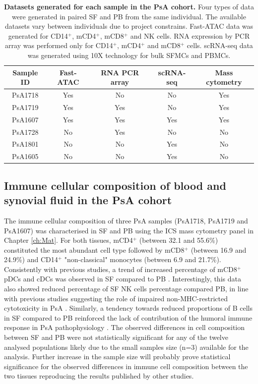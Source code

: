 \begin{table}[htbp]
\centering
\begin{tabular}{@{} c c c c c}
\toprule
\textbf{Sample ID} & \textbf{Fast-ATAC} & \textbf{RNA PCR array} & \textbf{scRNA-seq} & \textbf{Mass cytometry} \\
\midrule
\midrule
PsA1718 & Yes & No & No & Yes\\
PsA1719 & Yes & Yes & No & Yes\\
PsA1607 & Yes & Yes & Yes & Yes\\
PsA1728 & No & Yes & No & No\\
PsA1801 & No & No & Yes & No\\
PsA1605 & No & No & Yes & No\\
\bottomrule
\end{tabular}
\medskip %
\caption[Datasets generated for each sample in the PsA cohort.]{\textbf{Datasets generated for each sample in the PsA cohort.} Four types of data were generated in paired SF and PB from the same individual. The available datasets vary between individuals due to project constrains. Fast-ATAC data was generated for CD14$^+$, mCD4$^+$, mCD8$^+$ and NK cells. RNA expression by PCR array was performed only for CD14$^+$, mCD4$^+$ and mCD8$^+$ cells. scRNA-seq data was generated using 10X technology for bulk SFMCs and PBMCs.}
\label{tab:PSA_datasets_per_sample}
\end{table}
\bigskip %

\subsection{Immune cellular composition of blood and synovial fluid in the PsA cohort}
The immune cellular composition of three PsA samples (PsA1718, PsA1719 and PsA1607) was characterised in SF and PB using the ICS mass cytometry panel in Chapter \ref{ch:Mat}. For both tissues, mCD4$^+$ (between 32.1 and 55.6\%) constituted the most abundant cell type followed by mCD8$^+$ (between 16.9 and 24.9\%) and CD14$^+$ "non-classical" monocytes (between 6.9 and 21.7\%). Consistently with previous studies, a trend of increased percentage of mCD8$^+$ pDCs and cDCs was observed in SF compared to PB \parencite{Ross2000,Jongbloed2006}. Interestingly, this data also showed reduced percentage of SF NK cells percentage compared PB, in line with previous studies suggesting the role of impaired non-MHC-restricted cytotoxicity in PsA \parencite{Spadaro2004}. Similarly, a tendency towards reduced proportions of B cells  in SF compared to PB reinforced the lack of contribution of the humoral immune response in PsA pathophysiology \parencite{}. The observed differences in cell composition between SF and PB were not statistically significant for any of the twelve analysed populations likely due to the small samples size (n=3) available for the analysis. Further increase in the sample size will probably prove statistical significance for the observed differences in immune cell composition between the two tissues reproducing the results published by other studies.   

